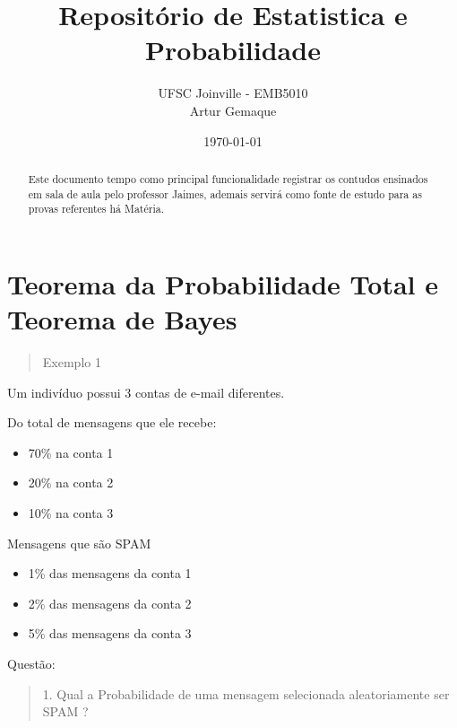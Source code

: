 \documentclass{article}
\title{\textbf{Repositório de Estatistica e Probabilidade}}
\author{UFSC Joinville - EMB5010 \\ Artur Gemaque}
\date{\today}
\begin{document}
\maketitle

\begin{abstract}
Este documento tempo como principal funcionalidade registrar os contudos ensinados 
em sala de aula pelo professor Jaimes, ademais servirá como fonte de estudo para as 
provas referentes há Matéria.
\end{abstract}

  \section{Teorema da Probabilidade Total e Teorema de Bayes}

    \begin{quote}
      Exemplo 1
    \end{quote}

    Um indivíduo possui 3 contas de e-mail diferentes. 
    \begin{multicols}{2}
      
    Do total de mensagens que ele recebe:
    
    \begin{itemize}
      \item 70\% na conta 1
      \item 20\% na conta 2
      \item 10\% na conta 3
    \end{itemize}

    Mensagens que são SPAM
    
    \begin{itemize}
      \item 1\% das  mensagens da conta 1 
      \item 2\% das  mensagens da conta 2
      \item 5\% das  mensagens da conta 3
    \end{itemize}

    \end{multicols}

    Questão:

    \begin{quote}
      1. Qual a Probabilidade de uma mensagem selecionada aleatoriamente ser SPAM ?
    \end{quote}
      
\end{document}
